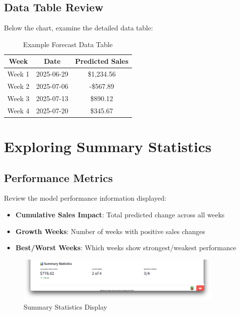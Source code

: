 \subsection{Data Table Review}

Below the chart, examine the detailed data table:

\begin{table}[H]
	\centering
	\begin{tabular}{|c|c|c|}
		\hline
		\textbf{Week} & \textbf{Date} & \textbf{Predicted Sales} \\
		\hline
		Week 1 & 2025-06-29 & \$1,234.56 \\
		Week 2 & 2025-07-06 & -\$567.89 \\
		Week 3 & 2025-07-13 & \$890.12 \\
		Week 4 & 2025-07-20 & \$345.67 \\
		\hline
	\end{tabular}
	\caption{Example Forecast Data Table}
	\label{tab:forecast_example}
\end{table}

\section{Exploring Summary Statistics}

\subsection{Performance Metrics}

Review the model performance information displayed:

\begin{itemize}
	\item \textbf{Cumulative Sales Impact}: Total predicted change across all weeks
	\item \textbf{Growth Weeks}: Number of weeks with positive sales changes
	\item \textbf{Best/Worst Weeks}: Which weeks show strongest/weakest performance
\end{itemize}

\begin{figure}[H]
	\centering
	\includegraphics[width=0.9\textwidth]{Images/03FirstStepsGuide/SummaryStatistics.png}
	\caption{Summary Statistics Display}
	\label{fig:summary_statistics}
\end{figure}

